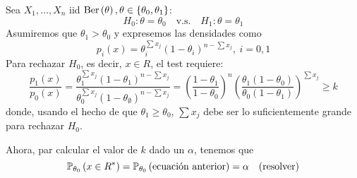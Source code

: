 \begin{example}
	Sea $X_1,\ldots, X_n$ iid $\text{Ber}\left(\theta\right), \theta\in\{\theta_0,\theta_1\}$: 
	\begin{equation}
		H_0:\theta =\theta_0\quad \text{v.s.}\quad H_1:\theta = \theta_1
	\end{equation} 
	Asumiremos que $\theta_1>\theta_0$ y expresemos las densidades como 
	\begin{equation}
		p_i(x) = \theta_i^{\sum x_j}(1-\theta_i)^{n-\sum x_j},\ i=0,1
	\end{equation}
	Para rechazar $H_0$, es decir, $x\in R$, el test requiere: 
	\begin{equation}
		\frac{p_1(x)}{p_0(x)} = \frac{\theta_1^{\sum x_j}(1-\theta_1)^{n-\sum x_j}}{\theta_0^{\sum x_j}(1-\theta_\emptyset)^{n-\sum x_j}} = \left(\frac{1-\theta_1}{1-\theta_0}\right)^n\left(\frac{\theta_1(1-\theta_0)}{\theta_0(1-\theta_1)}\right)^{\sum x_j}\geq k
	\end{equation}
	donde, usando el hecho de que $\theta_1\geq\theta_0$, $\sum x_j$ debe ser lo suficientemente grande para rechazar $H_0$.

	Ahora, par calcular el valor de $k$ dado un $\alpha$, tenemos que 
	\begin{equation}
		\mathbb{P}_{\theta_0} \left(x\in R^*\right) = \mathbb{P}_{\theta_0} \left(\text{ecuación anterior}\right) = \alpha \quad\text{(resolver)}
	\end{equation}
\end{example}


